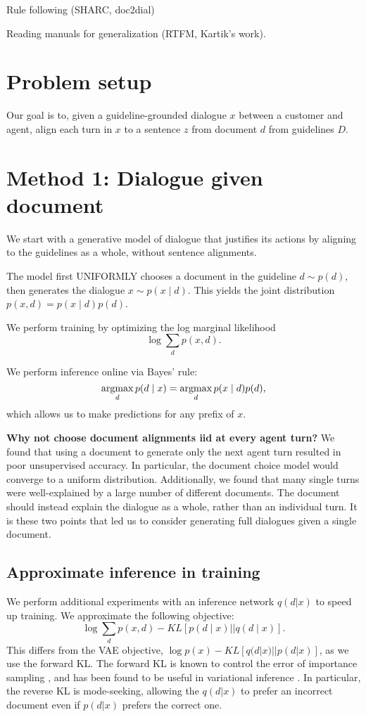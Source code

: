 \documentclass[11pt]{article}
\begin{document}
Rule following (SHARC, doc2dial)

Reading manuals for generalization (RTFM, Kartik's work).

\section{Problem setup}
Our goal is to, given a guideline-grounded dialogue $x$
between a customer and agent,
align each turn in $x$ to a sentence $z$ from document $d$ from guidelines $D$.


\section{Method 1: Dialogue given document}
We start with a generative model of dialogue that justifies its actions by
aligning to the guidelines as a whole, without sentence alignments.

The model first UNIFORMLY chooses a document in the guideline $d \sim p(d)$,
then generates the dialogue $x \sim p(x \mid d)$.
This yields the joint distribution $p(x,d) = p(x\mid d)p(d)$.

We perform training by optimizing the log marginal likelihood
\begin{equation}
\log\sum_d p(x,d).
\end{equation}

We perform inference online via Bayes' rule:
\begin{equation}
\operatorname*{argmax}_d p(d\mid x) = \operatorname*{argmax}_d p(x\mid d)p(d),
\end{equation}
which allows us to make predictions for any prefix of $x$.

\textbf{Why not choose document alignments iid at every agent turn?}
We found that using a document to generate only the next agent turn resulted in poor
unsupervised accuracy.
In particular, the document choice model would converge to a uniform distribution.
Additionally, we found that many single turns were well-explained by a large number of different
documents.
The document should instead explain the dialogue as a whole, rather than an individual turn.
It is these two points that led us to consider generating full dialogues given a single document.

\subsection{Approximate inference in training}
We perform additional experiments with an inference network $q(d|x)$ to speed up training.
We approximate the following objective:
\begin{equation}
\label{eqn:fkl}
\log\sum_d p(x,d) - KL[p(d\mid x) || q(d \mid x)].
\end{equation}
This differs from the VAE objective,
$\log p(x) - KL[q(d|x) || p(d|x)]$,
as we use the forward KL.
The forward KL is known to control the error of importance sampling \cite{chatterjee},
and has been found to be useful in variational inference \cite{fkl,rws}.
In particular, the reverse KL is mode-seeking,
allowing the $q(d|x)$ to prefer an incorrect document
even if $p(d|x)$ prefers the correct one.
\end{document}
